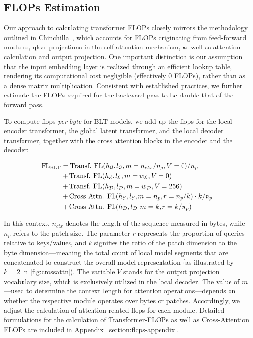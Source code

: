 \subsection{FLOPs Estimation} 
\label{section:flops}

Our approach to calculating transformer FLOPs closely mirrors the methodology outlined in Chinchilla~\citep{hoffmann2022training}, which accounts for FLOPs originating from feed-forward modules, qkvo projections in the self-attention mechanism, as well as attention calculation and output projection. One important distinction is our assumption that the input embedding layer is realized through an efficient lookup table, rendering its computational cost negligible (effectively 0 FLOPs), rather than as a dense matrix multiplication. Consistent with established practices, we further estimate the FLOPs required for the backward pass to be double that of the forward pass.

To compute flops \textit{per byte} for {\textsc BLT} models, we add up the flops for the local encoder transformer, the global latent transformer, and the local decoder transformer, together with the cross attention blocks in the encoder and the decoder:

\begin{align}
    \text{FL}_{\text{{\textsc BLT}}} &= \text{Transf. FL}(h_{\mathcal{G}}, l_{\mathcal{G}}, m=n_{ctx}/n_p, V=0) / n_p\\
   &+\text{Transf. FL}(h_{\mathcal{E}}, l_{\mathcal{E}}, m=w_{\mathcal{E}}, V=0) \\
   &+ \text{Transf. FL}(h_{\mathcal{D}}, l_{\mathcal{D}}, m=w_{\mathcal{D}}, V=256) \\ 
    &+ \text{Cross Attn. FL}(h_{\mathcal{E}}, l_{\mathcal{E}}, m=n_p, r=n_p/k) \cdot k/n_p \\ 
   &+ \text{Cross Attn. FL}(h_{\mathcal{D}}, l_{\mathcal{D}}, m=k, r=k/n_p)
\end{align}

In this context, $n_{ctx}$ denotes the length of the sequence measured in bytes, while $n_p$ refers to the patch size. The parameter $r$ represents the proportion of queries relative to keys/values, and $k$ signifies the ratio of the patch dimension to the byte dimension—meaning the total count of local model segments that are concatenated to construct the overall model representation (as illustrated by $k=2$ in \autoref{fig:crossattn}). The variable $V$ stands for the output projection vocabulary size, which is exclusively utilized in the local decoder. The value of $m$—used to determine the context length for attention operations—depends on whether the respective module operates over bytes or patches. Accordingly, we adjust the calculation of attention-related flops for each module. Detailed formulations for the calculation of Transformer-FLOPs as well as Cross-Attention FLOPs are included in Appendix~\ref{section:flops-appendix}.

